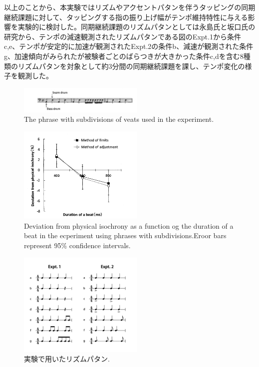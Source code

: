 \documentclass[twocolumn,10pt]{jarticle}
\begin{document}
以上のことから、本実験ではリズムやアクセントパタンを伴うタッピングの同期継続課題に対して、タッピングする指の振り上げ幅がテンポ維持特性に与える影響を実験的に検討した。同期継続課題のリズムパタンとしては永島氏と坂口氏\cite{Nagasima}の研究から、テンポの減速観測されたリズムパタンである図\label{Nagasima}のExpt.1から条件c,e、テンポが安定的に加速が観測されたExpt.2の条件b、減速が観測された条件g、加速傾向がみられたが被験者ごとのばらつきが大きかった条件c,dを含む8種類のリズムパタンを対象として約3分間の同期継続課題を課し、テンポ変化の様子を観測した。
\begin{figure}
  \centering
  \includegraphics[width=6cm]{Arao_f1.jpg}
  \caption{The phrase with subdivisions of veats used in the experiment.\cite{Arao}}
  \label{Arao_f1}
\end{figure}
\begin{figure}
  \centering
  \includegraphics[width=6cm]{Arao_f2.jpg}
  \caption{Deviation from physical isochrony as a function og the duration of a beat in the ecperiment using phrases with subdivisions.Eroor bars represent 95\% confidence intervals.\cite{Arao}}
  \label{Arao_f2}
\end{figure}
\begin{figure}
  \centering
  \includegraphics[width=6cm]{Nagasima.jpg}
  \caption{実験で用いたリズムパタン.\cite{Nagasima}}
  \label{Nagasima}
\end{figure}
\end{document}
